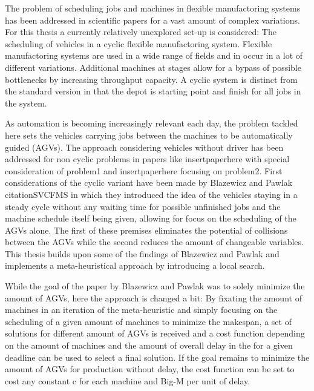 

The problem of scheduling jobs and machines in flexible manufactoring systems has been addressed in scientific papers
for a vast amount of complex variations. For this thesis a currently relatively unexplored
set-up is considered: The scheduling of vehicles in a cyclic flexible manufactoring
system. Flexible manufactoring systems are used in a wide range of fields and in
occur in a lot of different variations. Additional machines at stages allow for a
bypass of possible bottlenecks by increasing throughput capacity. A cyclic system is
distinct from the standard version in that the depot is starting point and finish
for all jobs in the system. 

As automation is becoming increasingly relevant each day, the problem tackled here sets
the vehicles carrying jobs between the machines to be automatically guided (AGVs). The approach
considering vehicles without driver has been addressed for non cyclic problems in papers
like insertpaperhere with special consideration of problem1 and insertpaperhere focusing on 
problem2. First considerations of the cyclic variant have been made by Blazewicz and Pawlak citationSVCFMS
in which they introduced the idea of the vehicles staying in a steady cycle without any
waiting time for possible unfinished jobs and the machine schedule itself being given, allowing 
for focus on the scheduling of the AGVs alone. The first of these premises eliminates the potential of collisions between
the AGVs while the second reduces the amount of changeable variables. This thesis builds upon some of the 
findings of Blazewicz and Pawlak and implements a meta-heuristical approach by introducing a local search.

While the goal of the paper by Blazewicz and Pawlak was to solely minimize the amount of AGVs, here the approach is changed a bit:
By fixating the amount of machines in an iteration of the meta-heuristic and simply focusing on the scheduling of a given
amount of machines to minimize the makespan, a set of solutions for different amount of AGVs is received and a cost function depending
on the amount of machines and the amount of overall delay in the for a given deadline can be used to select a final
solution. If the goal remains to minimize the amount of AGVs for production without delay, the cost function can be set
to cost any constant c for each machine and Big-M per unit of delay.






